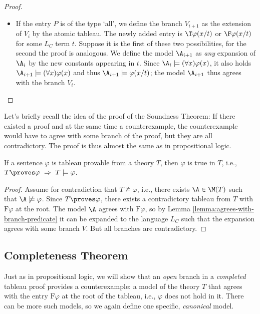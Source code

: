 \begin{proof}
\begin{itemize}
\begin{itemize}
            \item If the entry $P$ is of the type `all', we define the branch $V_{i+1}$ as the extension of $V_i$ by the atomic tableau. The newly added entry is $\T\varphi(x/t)$ or $\F\varphi(x/t)$ for some $L_C$ term $t$. Suppose it is the first of these two possibilities, for the second the proof is analogous. 
            We define the model $\A_{i+1}$ as \emph{any} expansion of $\A_i$ by the new constants appearing in $t$.    
            Since $\A_i\models(\forall x)\varphi(x)$, it also holds $\A_{i+1}\models(\forall x)\varphi(x)$ and thus $\A_{i+1}\models\varphi(x/t)$; the model $\A_{i+1}$ thus agrees with the branch $V_i$.
        \end{itemize}       
    \end{itemize}
\end{proof}

Let's briefly recall the idea of the proof of the Soundness Theorem: If there existed a proof and at the same time a counterexample, the counterexample would have to agree with some branch of the proof, but they are all contradictory. The proof is thus almost the same as in propositional logic.

\begin{theorem}[On Soundness]
If a sentence $\varphi$ is tableau provable from a theory $T$, then $\varphi$ is true in $T$, i.e., $T\proves\varphi\ \Rightarrow\ T\models\varphi$.    
\end{theorem}

\begin{proof}
Assume for contradiction that $T\not\models\varphi$, i.e., there exists $\A\in\M(T)$ such that $\A\not\models\varphi$. Since $T\proves\varphi$, there exists a contradictory tableau from $T$ with $\mathrm{F}\varphi$ at the root. The model $\A$ agrees with $\mathrm{F}\varphi$, so by Lemma \ref{lemma:agrees-with-branch-predicate} it can be expanded to the language $L_C$ such that the expansion agrees with some branch $V$. But all branches are contradictory.
\end{proof}


\subsection{Completeness Theorem}

Just as in propositional logic, we will show that an \emph{open} branch in a \emph{completed} tableau proof provides a counterexample: a model of the theory $T$ that agrees with the entry $\mathrm{F}\varphi$ at the root of the tableau, i.e., $\varphi$ does not hold in it. There can be more such models, so we again define one specific, \emph{canonical} model.


